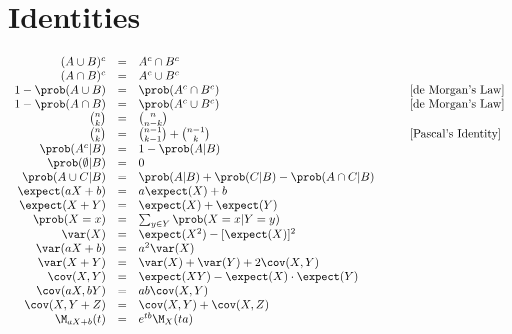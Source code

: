 \documentclass[11pt,a4paper]{article}
\begin{document}
\section{Identities}

\[
\begin{array}{rclcl}
  (A\cup B)^c&=&A^c\cap B^c&\quad\\
  (A\cap B)^c&=&A^c\cup B^c\\
  1-\prob(A\cup B)&=&\prob(A^c\cap B^c)&&[\text{de Morgan's Law}]\\
  1-\prob(A\cap B)&=&\prob(A^c\cup B^c)&&[\text{de Morgan's Law}]\\
  {n \choose k}&=&{n \choose n-k}\\
  {n \choose k}&=&{n-1 \choose k-1}+{n-1 \choose k}&&[\text{Pascal's Identity}]\\
  \prob(A^c|B)&=&1-\prob(A|B)\\
  \prob(\emptyset|B)&=&0\\
  \prob(A\cup C|B)&=&\prob(A|B)+\prob(C|B)-\prob(A\cap C|B)\\
  \expect(aX+b)&=&a\expect(X)+b\\
  \expect(X+Y)&=&\expect(X)+\expect(Y)\\
  \prob(X=x)&=&\sum_{y\in Y}\prob(X=x|Y=y)\\
  \var(X)&=&\expect(X^2)-[\expect(X)]^2\\
  \var(aX+b)&=&a^2\var(X)\\
  \var(X+Y)&=&\var(X)+\var(Y)+2\cov(X,Y)\\
  \cov(X,Y)&=&\expect(XY)-\expect(X)\cdot\expect(Y)\\
  \cov(aX,bY)&=&ab\cov(X,Y)\\
  \cov(X,Y+Z)&=&\cov(X,Y)+\cov(X,Z)\\
  \M_{aX+b}(t)&=&e^{tb}\M_X(ta)
\end{array}
\]
\end{document}
